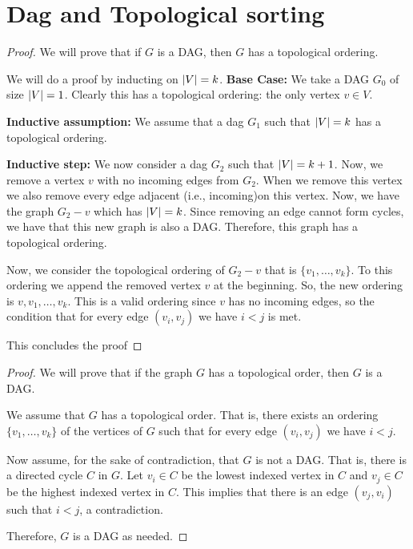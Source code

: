 \documentclass{article}
\begin{document}
\section{Dag and Topological sorting}
\begin{proof}
    We will prove that if $G$ is a DAG, then $G$ has a topological ordering.

    We will do a proof by inducting on $\lvert V \rvert = k$.
    \textbf{Base Case:} We take a DAG $G_{0}$ of size $\lvert V \rvert = 1$. Clearly this has a topological ordering: the only vertex $v \in V$.

    \textbf{Inductive assumption:} We assume that a dag $G_{1}$ such that $\lvert V \rvert = k$ has a topological ordering.

    \textbf{Inductive step:} We now consider a dag $G_{2}$ such that $\lvert V \rvert = k + 1$. Now, we remove a vertex $v$ with no incoming
    edges from $G_{2}$. When we remove this vertex we also remove every edge adjacent (i.e., incoming)on this vertex. Now, we have the
    graph $G_{2} - v$ which has $\lvert V \rvert = k$. Since removing an edge cannot form cycles, we have that this new graph is also a
    DAG. Therefore, this graph has a topological ordering.

    Now, we consider the topological ordering of $G_{2} - v$ that is $\{v_{1}, \dots, v_{k}\}$. To this ordering we append the removed
    vertex $v$ at the beginning. So, the new ordering is $v, v_{1}, \dots, v_{k}$. This is a valid ordering since $v$ has no incoming
    edges, so the condition that for every edge $(v_{i}, v_{j})$ we have $i < j$ is met.

    This concludes the proof
\end{proof}

\begin{proof}
    We will prove that if the graph $G$ has a topological order, then $G$ is a DAG.

    We assume that $G$ has a topological order. That is, there exists an ordering $\{v_{1}, \dots, v_{k}\}$ of the vertices of $G$ such
    that for every edge $(v_{i}, v_{j})$ we have $i < j$.

    Now assume, for the sake of contradiction, that $G$ is not a DAG. That is, there is a directed cycle 
    $C$ in $G$. Let $v_{i} \in C$ be the lowest indexed vertex in $C$ and $v_{j} \in C$ be the 
    highest indexed vertex in $C$. This implies that there is an edge $(v_{j}, v_{i})$ such that $i < j$, a contradiction.

    Therefore, $G$ is a DAG as needed.
\end{proof}
\end{document}
